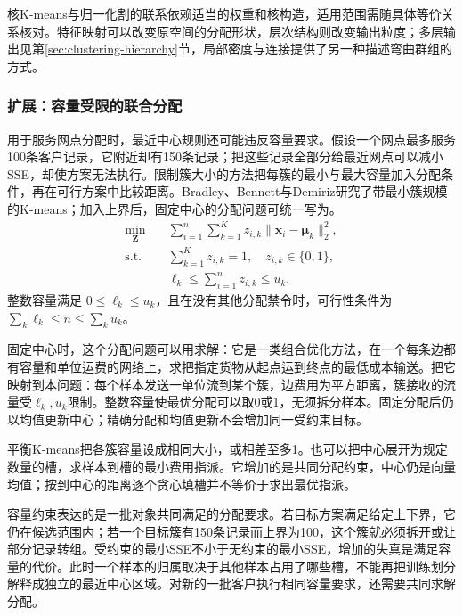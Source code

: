 核K-means与归一化割的联系依赖适当的权重和核构造，适用范围需随具体等价关系核对。特征映射可以改变原空间的分配形状，层次结构则改变输出粒度；多层输出见第\ref{sec:clustering-hierarchy}节，局部密度与连接提供了另一种描述弯曲群组的方式。
\subsubsection{扩展：容量受限的联合分配}

\label{sec:clustering-capacity}

用于服务网点分配时，最近中心规则还可能违反容量要求。假设一个网点最多服务100条客户记录，它附近却有150条记录；把这些记录全部分给最近网点可以减小SSE，却使方案无法执行。限制簇大小的方法把每簇的最小与最大容量加入分配条件，再在可行方案中比较距离。Bradley、Bennett与Demiriz研究了带最小簇规模的K-means；加入上界后，固定中心的分配问题可统一写为。
\begin{equation}
 \begin{aligned}
 \min_{\bm{Z}}\quad&
   \sum_{i=1}^n\sum_{k=1}^K
   z_{i,k}\lVert\bm{x}_i-\bm{\mu}_k\rVert_2^2,\\
 \text{s.t.}\quad&
   \sum_{k=1}^K z_{i,k}=1,\quad z_{i,k}\in\{0,1\},\\
 & \ell_k\leq\sum_{i=1}^n z_{i,k}\leq u_k.
 \end{aligned}
 \label{eq:clustering-capacity}
\end{equation}
整数容量满足 $0\leq\ell_k\leq u_k$，且在没有其他分配禁令时，可行性条件为 $\sum_k\ell_k\leq n\leq\sum_ku_k$。

固定中心时，这个分配问题可以用求解：它是一类组合优化方法，在一个每条边都有容量和单位运费的网络上，求把指定货物从起点运到终点的最低成本输送。把它映射到本问题：每个样本发送一单位流到某个簇，边费用为平方距离，簇接收的流量受$\ell_k,u_k$限制。整数容量使最优分配可以取0或1，无须拆分样本。固定分配后仍以均值更新中心；精确分配和均值更新不会增加同一受约束目标。

平衡K-means把各簇容量设成相同大小，或相差至多1。也可以把中心展开为规定数量的槽，求样本到槽的最小费用指派。它增加的是共同分配约束，中心仍是向量均值；按到中心的距离逐个贪心填槽并不等价于求出最优指派。

容量约束表达的是一批对象共同满足的分配要求。若目标方案满足给定上下界，它仍在候选范围内；若一个目标簇有150条记录而上界为100，这个簇就必须拆开或让部分记录转组。受约束的最小SSE不小于无约束的最小SSE，增加的失真是满足容量的代价。此时一个样本的归属取决于其他样本占用了哪些槽，不能再把训练划分解释成独立的最近中心区域。对新的一批客户执行相同容量要求，还需要共同求解分配。
